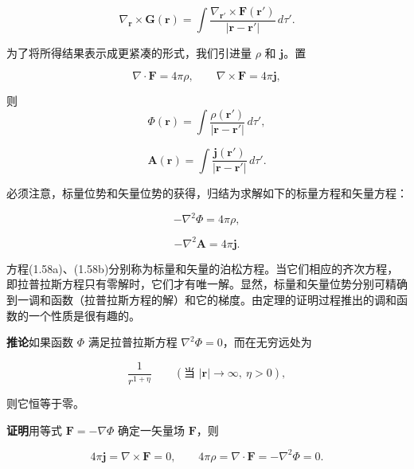 \documentclass[11pt,a4paper,oneside]{ctexbook}
\newcommand{\ve}[1]{\bm{#1}}
\begin{document}
\begin{equation*}
\nabla_{\ve{r}} \times \ve{G}(\ve{r}) = \int \frac{\nabla_{\ve{r}'} \times \ve{F}(\ve{r}')}{|\ve{r} - \ve{r}'|}\, d\tau'.
\end{equation*}

为了将所得结果表示成更紧凑的形式，我们引进量 $\rho$ 和 $\ve{j}$。置

\begin{equation*}
\nabla \cdot \ve{F} = 4\pi\rho, \qquad \nabla \times \ve{F} = 4\pi\ve{j},
\end{equation*}

则
\begin{equation}
\Phi(\ve{r}) = \int \frac{\rho(\ve{r}')}{|\ve{r} - \ve{r}'|}\, d\tau',
\tag{1.56}
\end{equation}

\begin{equation}
\ve{A}(\ve{r}) = \int \frac{\ve{j}(\ve{r}')}{|\ve{r} - \ve{r}'|}\, d\tau'.
\tag{1.57}
\end{equation}

必须注意，标量位势和矢量位势的获得，归结为求解如下的标量方程和矢量方程：

\begin{equation}
-\nabla^{2}\Phi = 4\pi\rho,
\tag{1.58a}
\end{equation}

\begin{equation}
-\nabla^{2}\ve{A} = 4\pi\ve{j}.
\tag{1.58b}
\end{equation}

方程(1.58a)、(1.58b)分别称为标量和矢量的泊松方程。当它们相应的齐次方程，即拉普拉斯方程只有零解时，它们才有唯一解。显然，标量和矢量位势分别可精确到一调和函数（拉普拉斯方程的解）和它的梯度。由定理的证明过程推出的调和函数的一个性质是很有趣的。

\textbf{推论}\quad 如果函数 $\Phi$ 满足拉普拉斯方程 $\nabla^{2}\Phi = 0$，而在无穷远处为

\begin{equation*}
\frac{1}{r^{1+\eta}} \qquad (\text{当 } |\ve{r}| \to \infty,\ \eta > 0),
\end{equation*}

则它恒等于零。

\textbf{证明}\quad 用等式 $\ve{F} = -\nabla\Phi$ 确定一矢量场 $\ve{F}$，则

\begin{equation*}
4\pi\ve{j} = \nabla \times \ve{F} = 0, \qquad 4\pi\rho = \nabla \cdot \ve{F} = -\nabla^{2}\Phi = 0.
\end{equation*}
\end{document}
